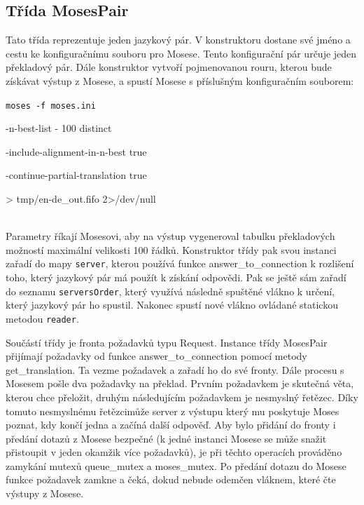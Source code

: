 \documentclass[12pt,a4paper]{report}
\begin{document}
\subsection{Třída MosesPair}
Tato třída reprezentuje jeden jazykový pár. V konstruktoru dostane své jméno a cestu ke konfiguračnímu souboru pro Mosese. Tento konfigurační pár určuje jeden překladový pár. Dále konstruktor vytvoří pojmenovanou rouru, kterou bude získávat výstup z Mosese, a spustí Mosese s příslušným konfiguračním souborem: \\

{\tt moses -f moses.ini

-n-best-list - 100 distinct

-include-alignment-in-n-best true

-continue-partial-translation true

> tmp/en-de\_out.fifo 2>/dev/null } \\

Parametry říkají Mosesovi, aby na výstup vygeneroval tabulku překladových možností maximální velikosti 100 řádků. Konstruktor třídy pak svou instanci zařadí do mapy {\tt server}, kterou používá funkce answer\_to\_connection k rozlišení toho, který jazykový pár má použít k získání odpovědi. Pak se ještě sám zařadí do seznamu {\tt serversOrder}, který využívá následně spuštěné vlákno k určení, který jazykový pár ho spustil. Nakonec spustí nové vlákno ovládané statickou metodou {\tt reader}.

Součástí třídy je fronta požadavků typu Request. Instance třídy MosesPair přijímají požadavky od funkce answer\_to\_connection pomocí metody get\_translation. Ta vezme požadavek a zařadí ho do své fronty. Dále procesu s Mosesem pošle dva požadavky na překlad. Prvním požadavkem je skutečná věta, kterou chce přeložit, druhým následujícím požadavkem je \clqq nesmyslný řetězec\crqq . Díky tomuto \clqq nesmyslnému řetězci\crqq  může server z výstupu který mu poskytuje Moses poznat, kdy končí jedna a začíná další odpověď. Aby bylo přidání do fronty i předání dotazů z Mosese bezpečné (k jedné instanci Mosese se může snažit přistoupit v jeden okamžik více požadavků), je při těchto operacích prováděno zamykání mutexů queue\_mutex a moses\_mutex. Po předání dotazu do Mosese funkce požadavek zamkne a čeká, dokud nebude odemčen vláknem, které čte výstupy z Mosese.
\end{document}
